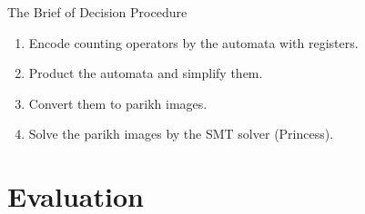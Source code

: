 \documentclass[landscape]{beamer}
\newcommand{\myvec}[1]{\overrightarrow{#1}}
\begin{document}






\begin{frame}{The Brief of Decision Procedure}
  \begin{enumerate}
    \item Encode counting operators by the automata with registers.
    \item Product the automata and simplify them.
    \item Convert them to parikh images.
    \item Solve the parikh images by the SMT solver (Princess).
  \end{enumerate}
\end{frame}


\section{Evaluation}
\end{document}
